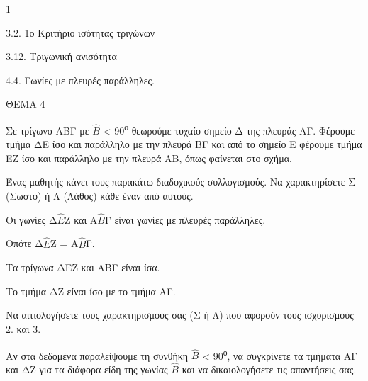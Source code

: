 \begin{ylh}{1}
    \item 3.2. 1ο Κριτήριο ισότητας τριγώνων
    \item 3.12. Τριγωνική ανισότητα
    \item 4.4. Γωνίες με πλευρές παράλληλες.
\end{ylh}

ΘΕΜΑ 4

Σε τρίγωνο ΑΒΓ με $\widehat{Β}$ \textless{} 90\textsuperscript{ο} θεωρούμε τυχαίο σημείο Δ της πλευράς ΑΓ. Φέρουμε τμήμα ΔΕ ίσο και παράλληλο με την πλευρά ΒΓ και από το σημείο Ε φέρουμε τμήμα ΕΖ ίσο και παράλληλο με την πλευρά ΑΒ, όπως φαίνεται στο σχήμα.

\begin{alist}
\item Ένας μαθητής κάνει τους παρακάτω διαδοχικούς συλλογισμούς. Να χαρακτηρίσετε Σ (Σωστό) ή Λ (Λάθος) κάθε έναν από αυτούς.

\begin{alist}
\item
  Οι γωνίες Δ$\widehat{Ε}$Ζ και Α$\widehat{Β}$Γ είναι γωνίες με πλευρές παράλληλες.
\item
  Οπότε Δ$\widehat{Ε}$Ζ = Α$\widehat{Β}$Γ.
\item
  Τα τρίγωνα ΔΕΖ και ΑΒΓ είναι ίσα.
\item
  Το τμήμα ΔΖ είναι ίσο με το τμήμα ΑΓ.


\item Να αιτιολογήσετε τους χαρακτηρισμούς σας (Σ ή Λ) που αφορούν τους ισχυρισμούς 2. και 3. 

\item Αν στα δεδομένα παραλείψουμε τη συνθήκη $\widehat{Β}$ \textless{} 90\textsuperscript{ο}, να συγκρίνετε τα τμήματα ΑΓ και ΔΖ για τα διάφορα είδη της γωνίας $\widehat{Β}$ και να δικαιολογήσετε τις απαντήσεις σας. 


\begin{center}
\end{center}
\end{alist}
\end{alist}
